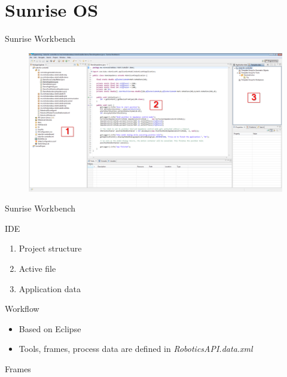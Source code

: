 \documentclass{beamer}
\begin{document}
\section{Sunrise OS}

\begin{frame}{Sunrise Workbench}
  \begin{figure}
    \includegraphics[width=\textwidth]{sunrise-workbench.png}
  \end{figure}
\end{frame}

\begin{frame}{Sunrise Workbench}
  \begin{block}{IDE}
    \begin{enumerate}
      \item Project structure
      \item Active file
      \item Application data
    \end{enumerate}
  \end{block}

  \begin{block}{Workflow}
    \begin{itemize}
      \item Based on Eclipse
      \item Tools, frames, process data are defined in \textit{RoboticsAPI.data.xml}
    \end{itemize}
  \end{block}
\end{frame}

\begin{frame}{Frames}
\end{frame}
\end{document}
